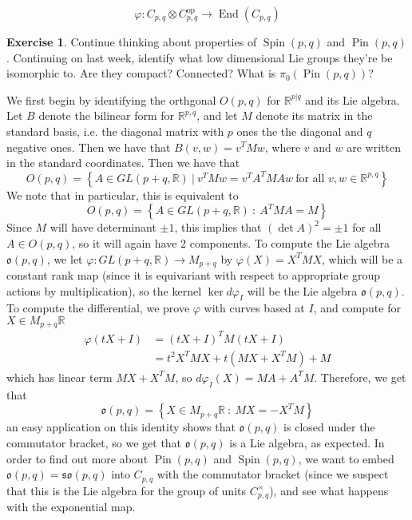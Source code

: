 \documentclass[psamsfonts]{amsart}
\theoremstyle{definition}
\newtheorem{exer}[thm]{Exercise}
\theoremstyle{remark}
\newcommand{\R}{\mathbb{R}}
\newcommand{\set}[1]{\left\lbrace #1 \right\rbrace}
\DeclareMathOperator{\End}{End}
\DeclareMathOperator{\Pin}{Pin}
\DeclareMathOperator{\Spin}{Spin}
\begin{document}
$$\varphi : C_{p,q} \otimes C_{p,q}^\text{op} \to \End(C_{p,q}) $$
%
\begin{exer}
Continue thinking about properties of $\Spin(p,q)$ and $\Pin(p,q)$. Continuing on last week, identify what low dimensional Lie groups they're be isomorphic to. Are they compact? Connected? What is $\pi_0(\Pin(p,q))$?
\end{exer}
We first begin by identifying the orthgonal $O(p,q)$ for $\R^{p|q}$ and its Lie algebra. Let $B$ denote the bilinear form for $\R^{p,q}$, and let $M$ denote its matrix in the standard basis, i.e. the diagonal matrix with $p$ ones the the diagonal and $q$ negative ones. Then we have that $B(v,w) = v^TMw$, where $v$ and $w$ are written in the standard coordinates. Then we have that 
$$O(p,q) = \set{A \in GL(p+q,\R) ~|~ v^TMw = v^TA^TMAw ~ \text{for all } v,w \in \R^{p,q}} $$
We note that in particular, this is equivalent to 
$$O(p,q) = \set{A \in GL(p+q, \R) ~:~ A^TMA = M} $$
Since $M$ will have determinant $\pm 1$, this implies that $(\det A)^2 = \pm 1$ for all $A \in O(p,q)$, so it will again have $2$ components. To compute the Lie algebra $\mathfrak{o}(p,q)$, we let $\varphi : GL(p+q, \R) \to M_{p + q}$ by $\varphi(X) = X^TMX$, which will be a constant rank map (since it is equivariant with respect to appropriate group actions by multiplication), so the kernel $\ker d\varphi_I$ will be the Lie algebra $\mathfrak{o}(p,q)$. To compute the differential, we prove $\varphi$ with curves based at $I$, and compute for $X \in M_{p+q}\R$
\begin{align*}
\varphi(tX + I) &= (tX + I)^T M (tX + I) \\
&= t^2X^TMX + t(MX + X^TM) + M
\end{align*}
which has linear term $MX + X^TM$, so $d\varphi_I(X) = MA + A^TM$. Therefore, we get that 
$$\mathfrak{o}(p,q) = \set{X \in M_{p+q}\R ~:~ MX = -X^TM} $$
an easy application on this identity shows that $\mathfrak{o}(p,q)$ is closed under the commutator bracket, so we get that $\mathfrak{o}(p,q)$ is a Lie algebra, as expected. In order to find out more about $\Pin(p,q)$ and $\Spin(p,q)$, we want to embed $\mathfrak{o}(p,q) = \mathfrak{so}(p,q)$ into $C_{p,q}$ with the commutator bracket (since we suspect that this is the Lie algebra for the group of units $C_{p,q}^\times$), and see what happens with the exponential map. 
\end{document}
